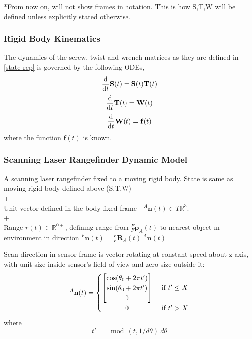 		*From now on, will not show frames in notation. This is how S,T,W will be defined unless explicitly stated otherwise.
						
	\subsubsection{Rigid Body Kinematics} \label{kinematics}
		The dynamics of the screw, twist and wrench matrices as they are defined in \ref{state rep} is governed by the following ODEs,
		\begin{equation}
			{\frac{\textnormal{d}}{\textnormal{d}t}} \mathbf{S}(t) =\mathbf{S}(t)\mathbf{T}(t)
		\end{equation}		
		\begin{equation}
			{\frac{\textnormal{d}}{\textnormal{d}t}} \mathbf{T}(t) = \mathbf{W}(t)
		\end{equation}		
		\begin{equation}
			{\frac{\textnormal{d}}{\textnormal{d}t}} \mathbf{W}(t)=\mathbf{f}(t)			
		\end{equation}
		where the function $\mathbf{f}(t)$ is known.
		
	\subsubsection{Scanning Laser Rangefinder Dynamic Model}
		A scanning laser rangefinder fixed to a moving rigid body. State is same as moving rigid body defined above (S,T,W)\\+\\
		Unit vector defined in the body fixed frame  - ${^{A}\mathbf{n}(t)} \in T\mathbb{R}^3$.\\+\\
		Range $r(t) \in \mathbb{R}^{0+}$, defining range from $^{F}_{F}\mathbf{p}^{}_{A}(t)$ to nearest object in environment in direction ${^{F}\mathbf{n}(t)} = {^{F}_{F}\mathbf{R}^{}_{A}(t)}\:{^{A}\mathbf{n}(t)}$
		
		Scan direction in sensor frame is vector rotating at constant speed about z-axis, with unit size inside sensor's field-of-view and zero size outside it:
		\begin{equation}
		^{A}\mathbf{n}(t) =
			\begin{cases} 
			      \hfill \begin{bmatrix}
			      		\cos(\theta_0 + 2\pi t') \\
			      		\sin(\theta_0 + 2\pi t') \\
			      		0
			      	\end{bmatrix}    \hfill & \text{ if $t' \leq X$} \\
			      \hfill \mathbf{0} \hfill & \text{ if $t' > X$} \\
			\end{cases} 
		\end{equation}
		where
		\begin{equation}
		t' = \mod(t,1/d\theta)\:d\theta
		\end{equation}
		
